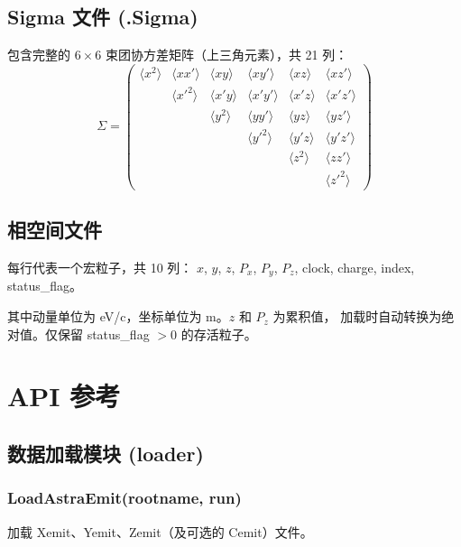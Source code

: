 \documentclass[11pt,a4paper]{article}
\begin{document}
\subsection{Sigma 文件 (.Sigma)}

包含完整的 $6 \times 6$ 束团协方差矩阵（上三角元素），共 21 列：
\begin{equation}
\Sigma = \begin{pmatrix}
\langle x^2 \rangle & \langle x x' \rangle & \langle x y \rangle &
\langle x y' \rangle & \langle x z \rangle & \langle x z' \rangle \\
& \langle x'^2 \rangle & \langle x' y \rangle & \langle x' y' \rangle &
\langle x' z \rangle & \langle x' z' \rangle \\
& & \langle y^2 \rangle & \langle y y' \rangle & \langle y z \rangle &
\langle y z' \rangle \\
& & & \langle y'^2 \rangle & \langle y' z \rangle &
\langle y' z' \rangle \\
& & & & \langle z^2 \rangle & \langle z z' \rangle \\
& & & & & \langle z'^2 \rangle
\end{pmatrix}
\end{equation}

\subsection{相空间文件}

每行代表一个宏粒子，共 10 列：
$x$, $y$, $z$, $P_x$, $P_y$, $P_z$, clock, charge, index, status\_flag。

其中动量单位为 eV/c，坐标单位为 m。$z$ 和 $P_z$ 为累积值，
加载时自动转换为绝对值。仅保留 status\_flag $> 0$ 的存活粒子。

\section{API 参考}

\subsection{数据加载模块 (loader)}

\subsubsection{LoadAstraEmit(rootname, run)}
加载 Xemit、Yemit、Zemit（及可选的 Cemit）文件。
\end{document}
